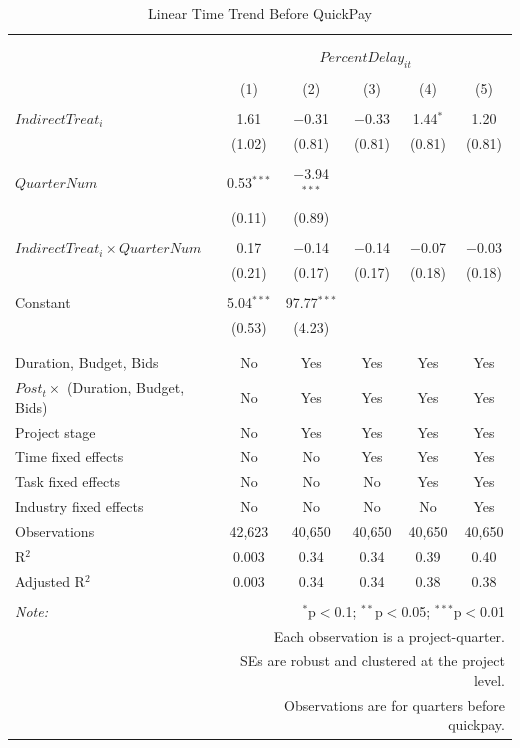 \documentclass[
]{article}
\begin{document}
\begin{table}[H] \centering 
  \caption{Linear Time Trend Before QuickPay} 
  \label{} 
\small 
\begin{tabular}{@{\extracolsep{-2pt}}lccccc} 
\\[-1.8ex]\hline 
\hline \\[-1.8ex] 
\\[-1.8ex] & \multicolumn{5}{c}{$PercentDelay_{it}$} \\ 
\\[-1.8ex] & (1) & (2) & (3) & (4) & (5)\\ 
\hline \\[-1.8ex] 
 $IndirectTreat_i$ & 1.61 & $-$0.31 & $-$0.33 & 1.44$^{*}$ & 1.20 \\ 
  & (1.02) & (0.81) & (0.81) & (0.81) & (0.81) \\ 
  & & & & & \\ 
 $QuarterNum$ & 0.53$^{***}$ & $-$3.94$^{***}$ &  &  &  \\ 
  & (0.11) & (0.89) &  &  &  \\ 
  & & & & & \\ 
 $IndirectTreat_i \times QuarterNum$ & 0.17 & $-$0.14 & $-$0.14 & $-$0.07 & $-$0.03 \\ 
  & (0.21) & (0.17) & (0.17) & (0.18) & (0.18) \\ 
  & & & & & \\ 
 Constant & 5.04$^{***}$ & 97.77$^{***}$ &  &  &  \\ 
  & (0.53) & (4.23) &  &  &  \\ 
  & & & & & \\ 
\hline \\[-1.8ex] 
Duration, Budget, Bids & No & Yes & Yes & Yes & Yes \\ 
$Post_t \times$  (Duration, Budget, Bids) & No & Yes & Yes & Yes & Yes \\ 
Project stage & No & Yes & Yes & Yes & Yes \\ 
Time fixed effects & No & No & Yes & Yes & Yes \\ 
Task fixed effects & No & No & No & Yes & Yes \\ 
Industry fixed effects & No & No & No & No & Yes \\ 
Observations & 42,623 & 40,650 & 40,650 & 40,650 & 40,650 \\ 
R$^{2}$ & 0.003 & 0.34 & 0.34 & 0.39 & 0.40 \\ 
Adjusted R$^{2}$ & 0.003 & 0.34 & 0.34 & 0.38 & 0.38 \\ 
\hline 
\hline \\[-1.8ex] 
\textit{Note:}  & \multicolumn{5}{r}{$^{*}$p$<$0.1; $^{**}$p$<$0.05; $^{***}$p$<$0.01} \\ 
 & \multicolumn{5}{r}{Each observation is a project-quarter.} \\ 
 & \multicolumn{5}{r}{SEs are robust and clustered at the project level.} \\ 
 & \multicolumn{5}{r}{Observations are for quarters before quickpay.} \\ 
\end{tabular} 
\end{table}
\end{document}
